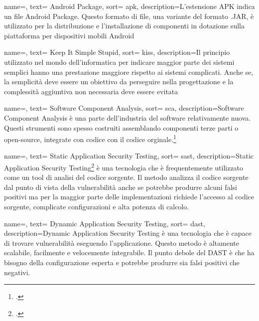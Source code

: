 {
name=,
text= Android Package,
sort= apk,
description={L'estensione APK indica un file Android Package.
Questo formato di file, una variante del formato .JAR, è utilizzato per la distribuzione e l'installazione di componenti in dotazione sulla piattaforma per dispositivi mobili Android}
}

{
name=,
text= Keep It Simple Stupid,
sort= kiss,
description={Il principio utilizzato nel mondo dell'informatica per indicare maggior parte dei sistemi semplici hanno una prestazione maggiore rispetto ai sistemi complicati.
Anche se, la semplicità deve essere un obiettivo da perseguire nella progettazione e la complessità aggiuntiva non necessaria deve essere evitata}
}

{
name=,
text= Software Component Analysis,
sort= sca,
description={Software Component Analysis è una parte dell'industria del software relativamente nuova. Questi strumenti sono spesso costruiti assemblando componenti terze parti o open-source, integrate con codice con il codice orginale.\footcite{site:sca}}
}

{
name=,
text= Static Application Security Testing,
sort= sast,
description={Static Application Security Testing\footcite{site:sast} è una tecnologia che è frequentemente utilizzato come un tool di analisi del codice sorgente.
Il metodo analizza il codice sorgente dal punto di vista della vulnerabilità anche se potrebbe produrre alcuni falsi positivi ma per la maggior parte delle implementazioni richiede l'accesso al codice sorgente, complicate configurazioni e alta potenza di calcolo.}
}


{
name=,
text= Dynamic Application Security Testing,
sort= dast,
description={Dynamic Application Security Testing è una tecnologia che è capace di trovare vulnerabilità eseguendo l'applicazione.
Questo metodo è altamente scalabile, facilmente e velocemente integrabile.
Il punto debole del DAST è che ha bisogno della configurazione esperta e potrebbe produrre sia falsi positivi che negativi.}
}

